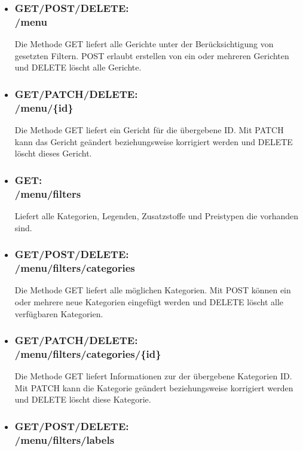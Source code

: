 \begin{itemize}
\item \subsubsection*{GET/POST/DELETE:\\ /menu} 
Die Methode GET liefert alle Gerichte unter der Berücksichtigung von gesetzten Filtern. POST erlaubt erstellen von ein oder mehreren Gerichten und DELETE löscht alle Gerichte. 
\item \subsubsection*{GET/PATCH/DELETE:\\ /menu/\{id\}} 
Die Methode GET liefert ein Gericht für die übergebene ID. Mit PATCH kann das Gericht geändert beziehungsweise korrigiert werden und DELETE löscht dieses Gericht.
\newpage
\item \subsubsection*{GET:\\ /menu/filters} 
Liefert alle Kategorien, Legenden, Zusatzstoffe und Preistypen die vorhanden sind.
\item \subsubsection*{GET/POST/DELETE:\\ /menu/filters/categories} 
Die Methode GET liefert alle möglichen Kategorien. Mit POST können ein oder mehrere neue Kategorien eingefügt werden und DELETE löscht alle verfügbaren Kategorien.
\item \subsubsection*{GET/PATCH/DELETE:\\ /menu/filters/categories/\{id\}} 
Die Methode GET liefert Informationen zur der übergebene Kategorien ID. Mit PATCH kann die Kategorie geändert beziehungsweise korrigiert werden und DELETE löscht diese Kategorie.
\item \subsubsection*{GET/POST/DELETE:\\ /menu/filters/labels} 

\end{itemize}
